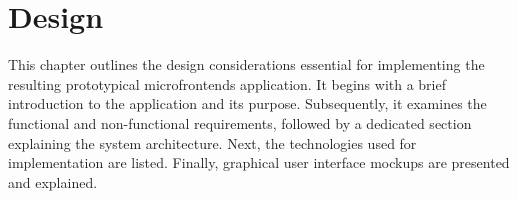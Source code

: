 \chapter{Design}
\label{chap:Design} 
This chapter outlines the design considerations essential for implementing the resulting prototypical microfrontends application. It begins with a brief introduction to the application and its purpose. Subsequently, it examines the functional and non-functional requirements, followed by a dedicated section explaining the system architecture. Next, the technologies used for implementation are listed. Finally, graphical user interface mockups are presented and explained.





